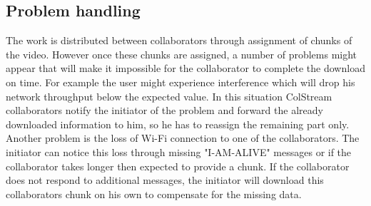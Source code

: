 \subsection{Problem handling}
The work is distributed between collaborators through assignment of chunks of the video. However once these chunks are assigned, a number of problems might appear that will make it impossible for the collaborator to complete the download on time. For example the user might experience interference which will drop his network throughput below the expected value. In this situation ColStream collaborators notify the initiator of the problem and forward the already downloaded information to him, so he has to reassign the remaining part only. Another problem is the loss of Wi-Fi connection to one of the collaborators. The initiator can notice this loss through missing "I-AM-ALIVE" messages or if the collaborator takes longer then expected to provide a chunk. If the collaborator does not respond to additional messages, the initiator will download this collaborators chunk on his own to compensate for the missing data.